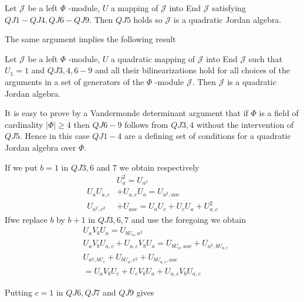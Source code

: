 \begin{thm}\label{c1:thm1}
  Let $\mathscr{J}$ be a left $\Phi$ -module, $U$ a mapping of
  $\mathscr{J}$ into End $\mathscr{J}$ satisfying $QJ1-QJ4,
  QJ6-QJ9$. Then $QJ5$ holds so $\mathscr{J}$ is a quadratic Jordan
  algebra. 
\end{thm}

The same argument implies the following result

\begin{thm}\label{c1:thm2}
  Let $\mathscr{J}$ be a left $\Phi$ -module, $U$ a quadratic mapping
  of $\mathscr{J}$ into End $\mathscr{J}$ such that $U_1=1$ and $QJ3,
  4, 6-9$ and all their bilinearizations hold for all choices of the
  arguments in a set of generators of the $\Phi$ -module
  $\mathscr{J}$. Then $\mathscr{J}$ is a quadratic Jordan algebra. 
\end{thm}

It is easy to prove by a Vandermonde determinant argument that if
$\Phi$ is a field of cardinality $|\Phi|\ge 4$ then $QJ6-9$ follows from
$QJ3, 4$ without the intervention of $QJ5$. Hence in this case $QJ1-4$
are a defining set of conditions for a quadratic Jordan algebra over
$\Phi$.  

If we put $b=1$ in $QJ3,6$ and $7$ we obtain respectively
\begin{align*}
  &U^{2}_a=U_{a^{2}}\tag*{QJ 10}\\
  U_aU_{a,c}&+U_{a,c}U_a=U_{a^{2},aoc}\tag*{QJ 11}\\
  U_{a^{2},c^{2}}&+U_{aoc}=U_a U_c+U_cU_a+U^{2}_{a,c}\tag*{QJ 12}
\end{align*}
If\pageoriginale we replace $b$ by $b+1$ in $QJ 3,6,7$ and use 
the foregoing we obtain
\begin{align*}
  &U_aV_bU_a=U_{bU_{a},a^{2}}\tag*{QJ13}\\
  &U_aV_bU_{a,c}+U_{a,c}V_bU_a=U_{bU_{a},aoc}+U_{a^{2},bU_{a,c}}\tag*{QJ14}\\
  &U_{a^{2},bU_c}+U_{bU_{a},c^{2}}+U_{bU_{a,c},aoc}\tag*{QJ15}\\
  &=U_aV_b U_c + U_c V_b U_a + U_{a,c} V_b U_{a,c}
\end{align*}

Putting $c=1$ in $QJ6, QJ7$ and $QJ9$ gives

